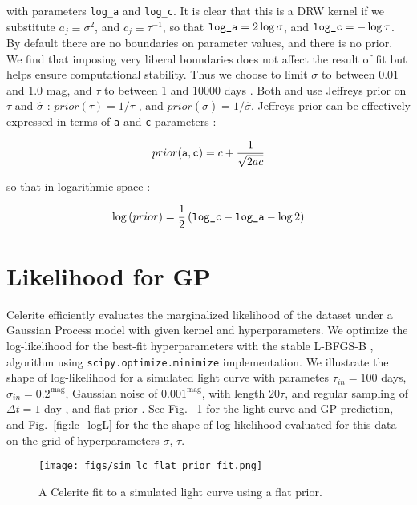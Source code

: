 \documentclass[fleqn,usenatbib]{mnras}  %
\begin{document}
with parameters  \verb|log_a| and \verb|log_c|.    It is clear that this is a DRW kernel if we substitute  $a_{j} \equiv \sigma^{2}$, and  $c_{j} \equiv \tau^{-1}$, so that $\verb|log_a| = 2 \log \sigma$, and $\verb|log_c| = - \log \tau$.  By default there are no boundaries on parameter values, and there is no prior.  We find that imposing very liberal boundaries does not affect the result of fit but helps ensure computational stability. Thus we choose to limit $\sigma$ to between 0.01 and 1.0 mag, and $\tau$ to between 1 and 10000 days . 
Both \cite{macleod2011}  and \cite{kozlowski2017a} use Jeffreys prior \citep{jeffreys46} on $\tau$ and $\hat{\sigma}$ : $prior(\tau) = 1 / \tau$ ,  and $prior(\hat{\sigma}) = 1 / \hat{\sigma}$.  Jeffreys prior  can be effectively expressed in terms of  \verb|a| and \verb|c| parameters :  

\begin{equation}
prior(\verb|a|,\verb|c|) = c + \frac{1}{\sqrt{2 ac}} 
\end{equation}

so that in logarithmic space : 

\begin{equation}
\log{(prior)} = \frac{1}{2} \left( \verb|log_c| - \verb|log_a|- \log{2} \right)
\end{equation}


\section{Likelihood for GP}
Celerite efficiently evaluates the marginalized likelihood of the dataset under a Gaussian Process model with given kernel and hyperparameters. We optimize the  log-likelihood  for the best-fit hyperparameters with the stable   L-BFGS-B  \citep{lu1995}, \citep{zhu1997}  algorithm   using  \verb|scipy.optimize.minimize| \citep{jones2001} implementation.  We illustrate the shape of log-likelihood for a simulated light curve with parametes  {$\tau_{in}=100$ days, $\sigma_{in} = 0.2^{\mathrm{mag}}$, Gaussian noise of $0.001^{\mathrm{mag}}$, with length $20 \tau$, and regular sampling of $\Delta t = 1 $ day  }, and flat prior . See   Fig. ~\ref{fig:lc_logL_fit}  for the light curve and GP prediction, and Fig.~\ref{fig:lc_logL} for the the shape of log-likelihood evaluated for this data on the grid of hyperparameters $\sigma$, $\tau$. 

\begin{figure}
\texttt{[image: figs/sim\_lc\_flat\_prior\_fit.png]}
\caption{A Celerite fit to a simulated light curve using a flat prior. }
\label{fig:lc_logL_fit}
\end{figure} 
\end{document}
